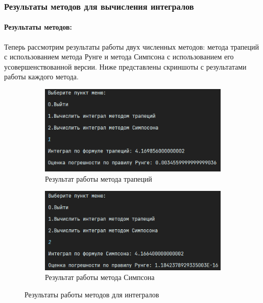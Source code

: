 \documentclass[12pt]{article}
\begin{document}
    \subsubsection{Результаты методов для вычисления интегралов}

    \paragraph{Результаты методов:}
    Теперь рассмотрим результаты работы двух численных методов: метода трапеций с использованием метода Рунге и метода Симпсона с использованием его усовершенствованной версии. Ниже представлены скриншоты с результатами работы каждого метода.

    \begin{figure}[ht]
        \centering
        \begin{subfigure}{0.4\textwidth}
            \includegraphics[width=\linewidth]{image/trapezoid_rule}
            \caption{Результат работы метода трапеций}
        \end{subfigure}
        \hfill
        \begin{subfigure}{0.4\textwidth}
            \includegraphics[width=\linewidth]{image/simpson_rule}
            \caption{Результат работы метода Симпсона}
        \end{subfigure}
        \caption{Результаты работы методов для интегралов}
    \end{figure}
\end{document}
